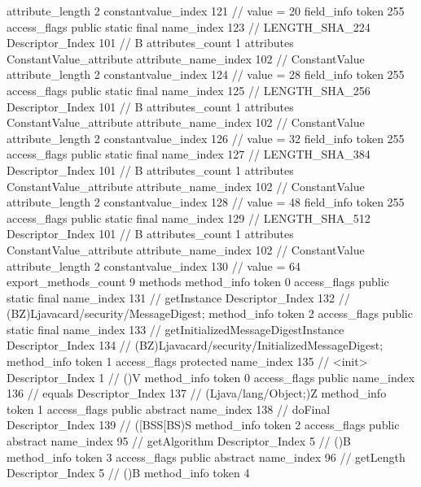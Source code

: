 {{{{{{{					attribute_length	2
					constantvalue_index	121		// value = 20
				}
				}
			}
			field_info {
				token	255
				access_flags	public static final
				name_index	123		// LENGTH_SHA_224
				Descriptor_Index	101		// B
				attributes_count	1
				attributes {
				ConstantValue_attribute {
					attribute_name_index	102		// ConstantValue
					attribute_length	2
					constantvalue_index	124		// value = 28
				}
				}
			}
			field_info {
				token	255
				access_flags	public static final
				name_index	125		// LENGTH_SHA_256
				Descriptor_Index	101		// B
				attributes_count	1
				attributes {
				ConstantValue_attribute {
					attribute_name_index	102		// ConstantValue
					attribute_length	2
					constantvalue_index	126		// value = 32
				}
				}
			}
			field_info {
				token	255
				access_flags	public static final
				name_index	127		// LENGTH_SHA_384
				Descriptor_Index	101		// B
				attributes_count	1
				attributes {
				ConstantValue_attribute {
					attribute_name_index	102		// ConstantValue
					attribute_length	2
					constantvalue_index	128		// value = 48
				}
				}
			}
			field_info {
				token	255
				access_flags	public static final
				name_index	129		// LENGTH_SHA_512
				Descriptor_Index	101		// B
				attributes_count	1
				attributes {
				ConstantValue_attribute {
					attribute_name_index	102		// ConstantValue
					attribute_length	2
					constantvalue_index	130		// value = 64
				}
				}
			}
			}
			export_methods_count	9
			methods {
				method_info {
					token	0
					access_flags	public static final
					name_index	131		// getInstance
					Descriptor_Index	132		// (BZ)Ljavacard/security/MessageDigest;
				}
				method_info {
					token	2
					access_flags	public static final
					name_index	133		// getInitializedMessageDigestInstance
					Descriptor_Index	134		// (BZ)Ljavacard/security/InitializedMessageDigest;
				}
				method_info {
					token	1
					access_flags	protected
					name_index	135		// <init>
					Descriptor_Index	1		// ()V
				}
				method_info {
					token	0
					access_flags	public
					name_index	136		// equals
					Descriptor_Index	137		// (Ljava/lang/Object;)Z
				}
				method_info {
					token	1
					access_flags	public abstract
					name_index	138		// doFinal
					Descriptor_Index	139		// ([BSS[BS)S
				}
				method_info {
					token	2
					access_flags	public abstract
					name_index	95		// getAlgorithm
					Descriptor_Index	5		// ()B
				}
				method_info {
					token	3
					access_flags	public abstract
					name_index	96		// getLength
					Descriptor_Index	5		// ()B
				}
				method_info {
					token	4
}}}}}
